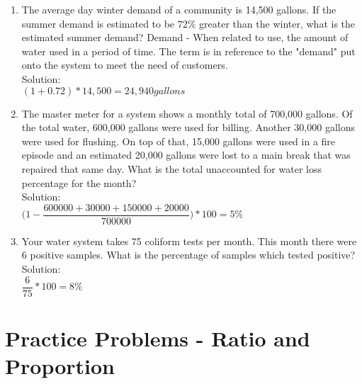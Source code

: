 \begin{enumerate}
\item The average day winter demand of a community is 14,500 gallons. If the summer demand is estimated to be $72 \%$ greater than the winter, what is the estimated summer demand? Demand - When related to use, the amount of water used in a period of time. The term is in reference to the "demand" put onto the system to meet the need of customers.\\
\vspace{0.2cm}
Solution:\\
$(1+0.72)*14,500 = \boxed{24,940 gallons}$\\
\vspace{0.2cm}

\item The master meter for a system shows a monthly total of 700,000 gallons. Of the total water, 600,000 gallons were used for billing. Another 30,000 gallons were used for flushing. On top of that, 15,000 gallons were used in a fire episode and an estimated 20,000 gallons were lost to a main break that was repaired that same day. What is the total unaccounted for water loss percentage for the month?\\
\vspace{0.2cm}
Solution:\\
$\Bigg(1-\dfrac{600000+30000+150000+20000}{700000}\Bigg)*100 = \boxed{5\%}$\\
\vspace{0.2cm}

\item Your water system takes 75 coliform tests per month. This month there were 6 positive samples. What is the percentage of samples which tested positive?
\vspace{0.2cm}
Solution:\\
$\dfrac{6}{75}*100 = \boxed{8\%}$\\
\vspace{0.2cm}
\end{enumerate}

\section*{Practice Problems - Ratio and Proportion} 

